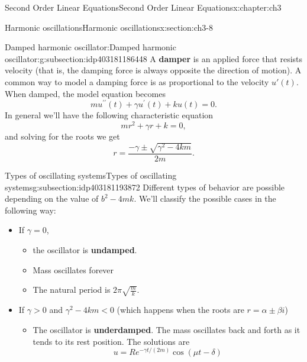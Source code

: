 \documentclass[oneside,10pt,]{book}
\newcommand{\terminology}[1]{\textbf{#1}}
\numberwithin{equation}{section}
\numberwithin{equation}{section}
\newcommand{\lt}{<}
\begin{document}
\begin{chapterptx}{Second Order Linear Equations}{}{Second Order Linear Equations}{}{}{x:chapter:ch3}
\begin{sectionptx}{Harmonic oscillations}{}{Harmonic oscillations}{}{}{x:section:ch3-8}
\typeout{************************************************}
%
\begin{subsectionptx}{Damped harmonic oscillator:}{}{Damped harmonic oscillator:}{}{}{g:subsection:idp403181186448}
A \terminology{damper} is an applied force that resists velocity (that is, the damping force is always opposite the direction of motion). A common way to model a damping force is as proportional to the velocity \(u'(t)\). When damped, the model equation becomes%
\begin{equation*}
mu^{\prime\prime}(t)+\gamma u^{\prime}(t)+ku(t)=0.
\end{equation*}
In general we'll have the following characteristic equation%
\begin{equation*}
mr^{2}+\gamma r+k=0,
\end{equation*}
and solving for the roots we get%
\begin{equation*}
r=\frac{-\gamma\pm\sqrt{\gamma^{2}-4km}}{2m}.
\end{equation*}
%
\end{subsectionptx}
%
%
\typeout{************************************************}
\typeout{************************************************}
%
\begin{subsectionptx}{Types of oscillating systems}{}{Types of oscillating systems}{}{}{g:subsection:idp403181193872}
Different types of behavior are possible depending on the value of \(b^{2}-4mk\). We'll classify the possible cases in the following way:%
%
\begin{itemize}[label=\textbullet]
\item{}If \(\gamma=0\),%
\begin{itemize}[label=$\circ$]
\item{}the oscillator is \terminology{undamped}.%
\item{}Mass oscillates forever%
\item{}The natural period is \(2\pi\sqrt{\frac{m}{k}}\).%
\end{itemize}
%
\item{}If \(\gamma>0\) and \(\gamma^{2}-4km\lt0\) (which happens when the roots are \(r=\alpha\pm\beta i\))%
\begin{itemize}[label=$\circ$]
\item{}The oscillator is \terminology{underdamped}. The mass oscillates back and forth as it tends to its rest position. The solutions are%
\begin{equation*}
u=Re^{-\gamma t/(2m)}\cos\left(\mu t-\delta\right)

\end{equation*}
\end{itemize}
\end{itemize}
\end{subsectionptx}
\end{sectionptx}
\end{chapterptx}
\end{document}
